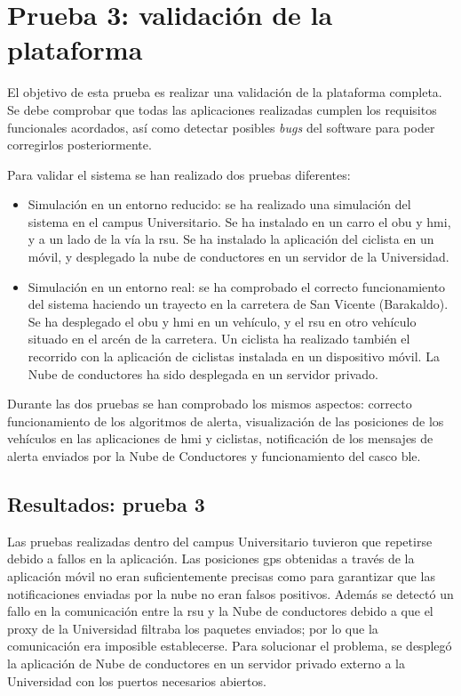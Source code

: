 \section{Prueba 3: validación de la plataforma}
El objetivo de esta prueba es realizar una validación de la plataforma
completa. Se debe comprobar que todas las aplicaciones realizadas cumplen los
requisitos funcionales acordados, así como detectar posibles \emph{bugs} del
software para poder corregirlos posteriormente.

Para validar el sistema se han realizado dos pruebas diferentes:

\begin{itemize}
	\item Simulación en un entorno reducido: se ha realizado una simulación	del
	sistema en el campus Universitario. Se ha instalado en un carro el \gls{obu}
	y \gls{hmi}, y a un lado de la vía la \gls{rsu}. Se ha instalado la
	aplicación del ciclista en un móvil, y desplegado la nube de conductores en
	un servidor de la Universidad.

	\item Simulación en un entorno real: se ha comprobado el correcto
	funcionamiento del sistema haciendo un trayecto en la carretera de San
	Vicente (Barakaldo). Se ha desplegado el \gls{obu} y \gls{hmi} en un
	vehículo,	y el \gls{rsu} en otro vehículo situado en el arcén de la
	carretera. Un ciclista ha realizado también el recorrido con la aplicación
	de ciclistas instalada en un dispositivo móvil. La Nube de conductores ha
	sido desplegada en un servidor privado.
\end{itemize}

Durante las dos pruebas se han comprobado los mismos aspectos: correcto
funcionamiento de los algoritmos de alerta, visualización de las posiciones
de los vehículos en las aplicaciones de \gls{hmi} y ciclistas, notificación
de los mensajes de alerta enviados por la Nube de Conductores y
funcionamiento del casco \gls{ble}.

\subsection{Resultados: prueba 3}
Las pruebas realizadas dentro del campus Universitario tuvieron que repetirse
debido a fallos en la aplicación. Las posiciones \gls{gps} obtenidas a través
de la aplicación móvil no eran suficientemente precisas como para garantizar
que las notificaciones enviadas por la nube no eran falsos positivos. Además
se detectó un fallo en la comunicación entre la \gls{rsu} y la Nube de
conductores debido a que el proxy de la Universidad filtraba los paquetes
enviados; por lo que la comunicación era imposible establecerse. Para
solucionar el problema, se desplegó la aplicación de Nube de conductores en
un servidor privado externo a la Universidad con los puertos necesarios
abiertos.

